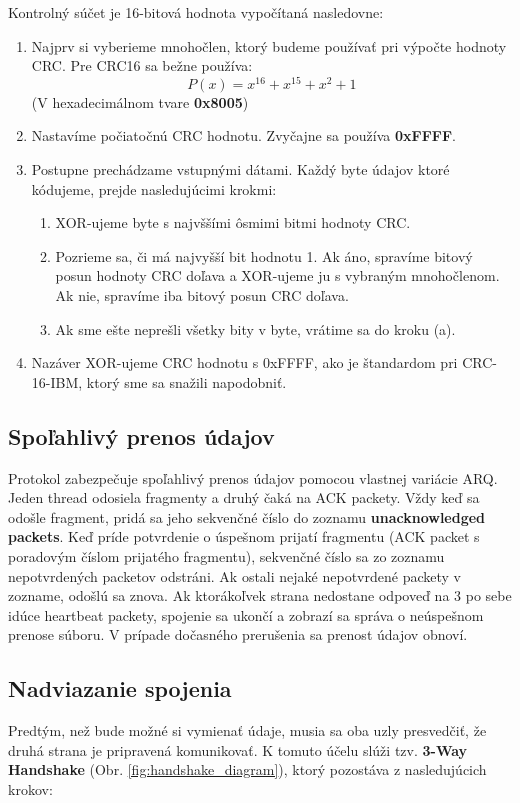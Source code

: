 \documentclass[a4paper,12pt]{article}
\begin{document}
Kontrolný súčet je 16-bitová hodnota vypočítaná nasledovne:
	\begin{enumerate}
		\item Najprv si vyberieme mnohočlen, ktorý budeme používať pri výpočte hodnoty CRC. Pre CRC16 sa bežne používa:
		\[ P(x) = x^{16} + x^{15} + x^2 + 1 \] (V hexadecimálnom tvare \textbf{0x8005})
		
		\item Nastavíme počiatočnú CRC hodnotu. Zvyčajne sa používa \textbf{0xFFFF}.
		
		\item Postupne prechádzame vstupnými dátami. Každý byte údajov ktoré kódujeme, prejde nasledujúcimi krokmi:
		\begin{enumerate}
		    \item XOR-ujeme byte s najvššími ôsmimi bitmi hodnoty CRC.
		    \item Pozrieme sa, či má najvyšší bit hodnotu 1. Ak áno, spravíme bitový posun hodnoty CRC doľava a XOR-ujeme ju s vybraným mnohočlenom. Ak nie, spravíme iba bitový posun CRC doľava. 
		    \item Ak sme ešte neprešli všetky bity v byte, vrátime sa do kroku (a).
		\end{enumerate}

		\item Nazáver XOR-ujeme CRC hodnotu s 0xFFFF, ako je štandardom pri CRC-16-IBM, ktorý sme sa snažili napodobniť.
    \end{enumerate}

    \subsection{Spoľahlivý prenos údajov}\label{prenos}
    Protokol zabezpečuje spoľahlivý prenos údajov pomocou vlastnej variácie ARQ. Jeden thread odosiela fragmenty a druhý čaká na ACK packety. Vždy keď sa odošle fragment, pridá sa jeho sekvenčné číslo do zoznamu \textbf{unacknowledged packets}. Keď príde potvrdenie o úspešnom prijatí fragmentu (ACK packet s poradovým číslom prijatého fragmentu), sekvenčné číslo sa zo zoznamu nepotvrdených packetov odstráni. Ak ostali nejaké nepotvrdené packety v zozname, odošlú sa znova. Ak ktorákoľvek strana nedostane odpoveď na 3 po sebe idúce heartbeat packety, spojenie sa ukončí a zobrazí sa správa o neúspešnom prenose súboru. V prípade dočasného prerušenia sa prenost údajov obnoví.


    \subsection{Nadviazanie spojenia}
	Predtým, než bude možné si vymienať údaje, musia sa oba uzly presvedčiť, že druhá strana je pripravená komunikovať. K tomuto účelu slúži tzv. \textbf{3-Way Handshake} (Obr. \ref{fig:handshake_diagram}), ktorý pozostáva z nasledujúcich krokov:
	
\end{document}
